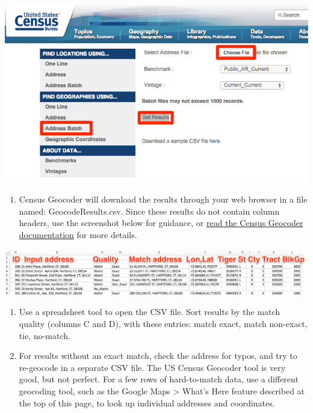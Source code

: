 \documentclass[
  english,
]{book}
\providecommand{\tightlist}{%
  \setlength{\itemsep}{0pt}\setlength{\parskip}{0pt}}
\begin{document}
\includegraphics{images/09-transform/census-geocoder-batch.png}

\begin{enumerate}
\def\labelenumi{\arabic{enumi})}
\setcounter{enumi}{6}
\tightlist
\item
  Census Geocoder will download the results through your web browser in a file named: GeocodeResults.csv. Since these results do not contain column headers, use the screenshot below for guidance, or \href{http://www.census.gov/geo/maps-data/data/geocoder.html}{read the Census Geocoder documentation} for more details.
\end{enumerate}

\includegraphics{images/09-transform/geocode-results.png}

\begin{enumerate}
\def\labelenumi{\arabic{enumi})}
\setcounter{enumi}{7}
\item
  Use a spreadsheet tool to open the CSV file. Sort results by the match quality (columns C and D), with these entries: match exact, match non-exact, tie, no-match.
\item
  For results without an exact match, check the address for typos, and try to re-geocode in a separate CSV file. The US Census Geocoder tool is very good, but not perfect. For a few rows of hard-to-match data, use a different geocoding tool, such as the Google Maps \textgreater{} What's Here feature described at the top of this page, to look up individual addresses and coordinates.
\end{enumerate}
\end{document}
